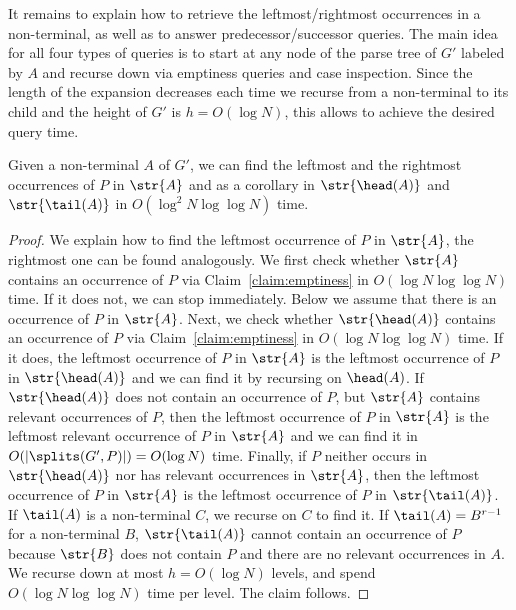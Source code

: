 It remains to explain how to retrieve the leftmost/rightmost occurrences in a non-terminal, as well as to answer predecessor/successor queries. The main idea for all four types of queries is to start at any node of the parse tree of $G'$ labeled by $A$ and recurse down via emptiness queries and case inspection. Since the length of the expansion decreases each time we recurse from a non-terminal to its child and the height of $G'$ is $h = O(\log N)$, this allows to achieve the desired query time. 


\begin{claim}\label{claim:leftmost_rightmost}
Given a non-terminal $A$ of $G'$, we can find the leftmost and the rightmost occurrences of $P$ in $\str{A}$ and as a corollary in $\str{\head(A)}$ and $\str{\tail(A)}$ in $O(\log^{2} N\log\log N)$ time.  %
\end{claim}
\begin{proof}
We explain how to find the leftmost occurrence of $P$ in $\str{A}$, the rightmost one can be found analogously. We first check whether $\str{A}$ contains an occurrence of $P$ via Claim~\ref{claim:emptiness} in $O(\log N\log \log N)$ time. If it does not, we can stop immediately. Below we assume that there is an occurrence of $P$ in  $\str{A}$. Next, we check whether $\str{\head(A)}$ contains an occurrence of $P$ via Claim~\ref{claim:emptiness} in $O(\log N\log \log N)$ time. If it does, the leftmost occurrence of $P$ in $\str{A}$ is the leftmost occurrence of $P$ in $\str{\head(A)}$ and we can find it by recursing on $\head(A)$. If $\str{\head(A)}$ does not contain an occurrence of $P$, but $\str{A}$ contains relevant occurrences of $P$, then the leftmost occurrence of $P$ in $\str{A}$ is the leftmost relevant occurrence of $P$ in $\str{A}$ and we can find it in $O(|\splits(G',P)|) = O(\log N)$ time. Finally, if $P$ neither occurs in $\str{\head(A)}$ nor has relevant occurrences in $\str{A}$, then the leftmost occurrence of $P$ in $\str{A}$ is the leftmost occurrence of $P$ in $\str{\tail(A)}$. If $\tail(A)$ is a non-terminal $C$, we recurse on $C$ to find it. If $\tail(A)=B^{r-1}$ for a non-terminal $B$, $\str{\tail(A)}$ cannot contain an occurrence of $P$ because $\str{B}$ does not contain $P$ and there are no relevant occurrences in $A$. We recurse down at most $h = O(\log N)$ levels, and spend $O(\log N\log \log N)$ time per level. The claim follows.
\end{proof}

